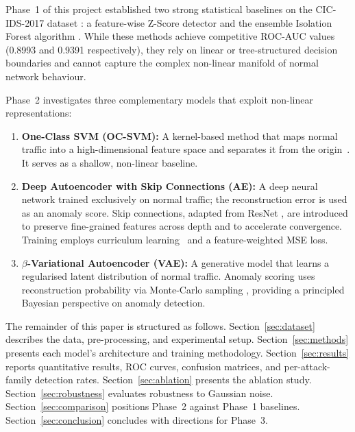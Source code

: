 \documentclass[conference]{IEEEtran}
\begin{document}
Phase~1 of this project established two strong statistical baselines on the
CIC-IDS-2017 dataset \cite{ids2017}: a feature-wise Z-Score detector and the
ensemble Isolation Forest algorithm \cite{liu2008isolation}. While these
methods achieve competitive ROC-AUC values (0.8993 and 0.9391 respectively),
they rely on linear or tree-structured decision boundaries and cannot capture
the complex non-linear manifold of normal network behaviour.

Phase~2 investigates three complementary models that exploit non-linear
representations:
\begin{enumerate}
  \item \textbf{One-Class SVM (OC-SVM):} A kernel-based method that maps
    normal traffic into a high-dimensional feature space and separates it from
    the origin~\cite{scholkopf2001estimating}. It serves as a shallow,
    non-linear baseline.
  \item \textbf{Deep Autoencoder with Skip Connections (AE):} A deep neural
    network trained exclusively on normal traffic; the reconstruction error is
    used as an anomaly score. Skip connections, adapted from ResNet
    \cite{he2016deep}, are introduced to preserve fine-grained features across
    depth and to accelerate convergence. Training employs curriculum
    learning~\cite{bengio2009curriculum} and a feature-weighted MSE loss.
  \item \textbf{$\beta$-Variational Autoencoder (VAE):} A generative model
    that learns a regularised latent distribution of normal traffic. Anomaly
    scoring uses reconstruction probability via Monte-Carlo sampling
    \cite{an2015variational}, providing a principled Bayesian perspective on
    anomaly detection.
\end{enumerate}

The remainder of this paper is structured as follows. Section~\ref{sec:dataset}
describes the data, pre-processing, and experimental setup. Section~\ref{sec:methods}
presents each model's architecture and training methodology. Section~\ref{sec:results}
reports quantitative results, ROC curves, confusion matrices, and per-attack-family
detection rates. Section~\ref{sec:ablation} presents the ablation study.
Section~\ref{sec:robustness} evaluates robustness to Gaussian noise.
Section~\ref{sec:comparison} positions Phase~2 against Phase~1 baselines.
Section~\ref{sec:conclusion} concludes with directions for Phase~3.

\end{document}
